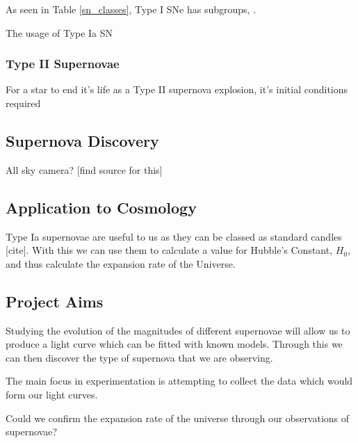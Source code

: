 \documentclass[twocolumn]{revtex4}
\begin{document}
As seen in Table \ref{sn_classes}, Type I SNe has subgroups,  \cite{posn}.

The usage of Type Ia SN 

\vspace{-3ex}
\subsubsection{Type II Supernovae}
\vspace{-2ex}

For a star to end it's life as a Type II supernova explosion, it's initial conditions required 

\vspace{-3ex}
\subsection{Supernova Discovery}
\vspace{-2ex}

All sky camera? [find source for this]

\vspace{-3ex}
\subsection{Application to Cosmology}
\vspace{-2ex}

Type Ia supernovae are useful to us as they can be classed as standard candles [cite]. With this we can use them to calculate a value for Hubble's Constant, $H_0$, and thus calculate the expansion rate of the Universe.

\vspace{-3ex}
\subsection{Project Aims}
\vspace{-2ex}

Studying the evolution of the magnitudes of different supernovae will allow us to produce a light curve which can be fitted with known models. Through this we can then discover the type of supernova that we are observing. 

The main focus in experimentation is attempting to collect the data which would form our light curves. 

Could we confirm the expansion rate of the universe through our observations of supernovae? 

\vspace{-3ex}
\end{document}
